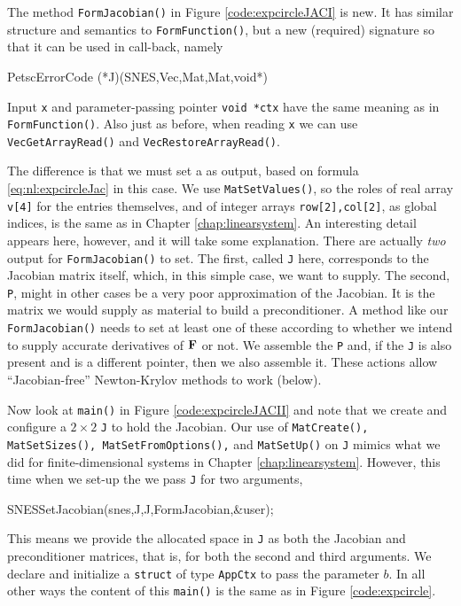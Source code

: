 The method \texttt{FormJacobian()} in Figure \ref{code:expcircleJACI} is new.  It has similar structure and semantics to \texttt{FormFunction()}, but a new (required) signature so that it can be used in call-back, namely
\begin{code}
PetscErrorCode (*J)(SNES,Vec,Mat,Mat,void*)
\end{code}
Input \pVec \texttt{x} and parameter-passing pointer \texttt{void *ctx} have the same meaning as in \texttt{FormFunction()}.  Also just as before, when reading \texttt{x} we can use \texttt{VecGetArrayRead()} and \texttt{VecRestoreArrayRead()}.

The difference is that we must set a \pMat as output, based on formula \eqref{eq:nl:expcircleJac} in this case.  We use \texttt{MatSetValues()}, so the roles of real array \texttt{v[4]} for the entries themselves, and of integer arrays \texttt{row[2],col[2]}, as global indices, is the same as in Chapter \ref{chap:linearsystem}.  An interesting detail appears here, however, and it will take some explanation.  There are actually \emph{two} output \pMats for \texttt{FormJacobian()} to set.  The first, called \texttt{J} here, corresponds to the Jacobian matrix itself, which, in this simple case, we want to supply.  The second, \texttt{P}, might in other cases be a very poor approximation of the Jacobian.  It is the matrix we would supply as material to build a preconditioner.  A method like our \texttt{FormJacobian()} needs to set at least one of these \pMats according to whether we intend to supply accurate derivatives of $\mathbf{F}$ or not.  We assemble the \pMat \texttt{P} and, if the \pMat \texttt{J} is also present and is a different pointer, then we also assemble it.  These actions allow ``Jacobian-free'' Newton-Krylov methods to work (below).

Now look at \texttt{main()} in Figure \ref{code:expcircleJACII} and note that we create and configure a $2\times 2$ \pMat \texttt{J} to hold the Jacobian.  Our use of \texttt{MatCreate(), MatSetSizes(), MatSetFromOptions(),} and \texttt{MatSetUp()} on \texttt{J} mimics what we did for finite-dimensional systems in Chapter \ref{chap:linearsystem}.  However, this time when we set-up the \pSNES we pass \texttt{J} for two arguments,
\begin{code}
SNESSetJacobian(snes,J,J,FormJacobian,&user);
\end{code}
This means we provide the allocated space in \texttt{J} as both the Jacobian and preconditioner matrices, that is, for both the second and third \pMat arguments.  We declare and initialize a \texttt{struct} of type \texttt{AppCtx} to pass the parameter $b$.  In all other ways the content of this \texttt{main()} is the same as in Figure \ref{code:expcircle}.

